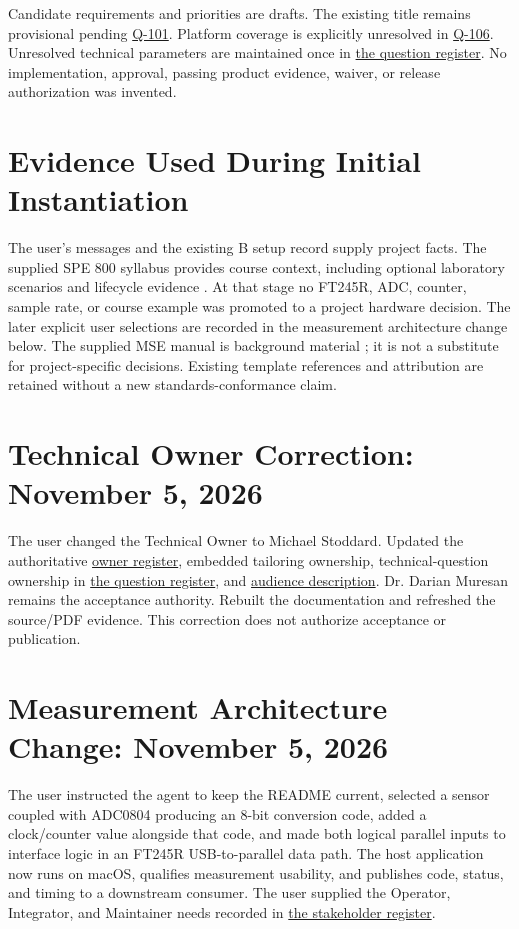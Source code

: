 Candidate requirements and priorities are drafts. The existing title remains provisional pending \hyperref[Question:Q-101]{Q-101}. Platform coverage is explicitly unresolved in \hyperref[Question:Q-106]{Q-106}. Unresolved technical parameters are maintained once in \hyperref[Table:OwnedQuestions]{the question register}. No implementation, approval, passing product evidence, waiver, or release authorization was invented.

\section{Evidence Used During Initial Instantiation}
The user's messages and the existing B setup record supply project facts. The supplied SPE 800 syllabus provides course context, including optional laboratory scenarios and lifecycle evidence \cite{SPE800Syllabus}. At that stage no FT245R, ADC, counter, sample rate, or course example was promoted to a project hardware decision. The later explicit user selections are recorded in the measurement architecture change below. The supplied MSE manual is background material \cite{MSEManual124}; it is not a substitute for project-specific decisions. Existing template references and attribution are retained without a new standards-conformance claim.

\section{Technical Owner Correction: November 5, 2026}
The user changed the Technical Owner to Michael Stoddard. Updated the authoritative \hyperref[Table:ProjectOwners]{owner register}, embedded tailoring ownership, technical-question ownership in \hyperref[Table:OwnedQuestions]{the question register}, and \hyperref[Chapter:Introduction]{audience description}. Dr. Darian Muresan remains the acceptance authority. Rebuilt the documentation and refreshed the source/PDF evidence. This correction does not authorize acceptance or publication.

\section{Measurement Architecture Change: November 5, 2026}
The user instructed the agent to keep the README current, selected a sensor coupled with ADC0804 producing an 8-bit conversion code, added a clock/counter value alongside that code, and made both logical parallel inputs to interface logic in an FT245R USB-to-parallel data path. The host application now runs on macOS, qualifies measurement usability, and publishes code, status, and timing to a downstream consumer. The user supplied the Operator, Integrator, and Maintainer needs recorded in \hyperref[Table:StakeholderNeeds]{the stakeholder register}.

